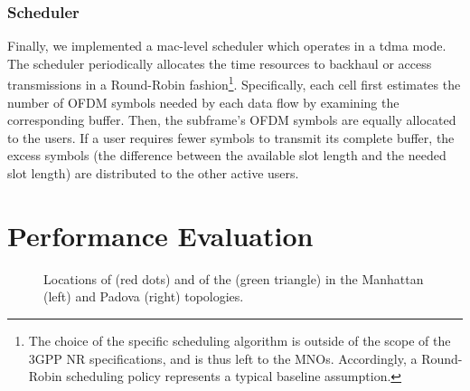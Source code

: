 \subsubsection{Scheduler}
\label{sub:scheduler}
Finally, we implemented a \gls{mac}-level scheduler which operates in a \gls{tdma} mode. The scheduler periodically allocates the time resources to backhaul or access transmissions in a Round-Robin fashion\footnote{The choice of the specific scheduling algorithm is outside of the scope of the 3GPP NR specifications, and is thus left to the MNOs. Accordingly, a Round-Robin scheduling policy represents a typical baseline assumption.}. Specifically, each cell first estimates the number of OFDM symbols needed by each data flow by examining the corresponding buffer. Then, the subframe's OFDM symbols are equally allocated to the users. If a user requires fewer symbols to transmit its complete buffer, the excess symbols (the difference between the available slot length and the needed slot length) are distributed to the other active users. \section {Performance Evaluation}
\label{s:simulation_analysis}


\begin{figure}
    \centering
    \caption{Locations of \nodes{} (red dots) and of the \donor{} (green triangle) in the Manhattan (left) and Padova (right) topologies.}
\end{figure}







